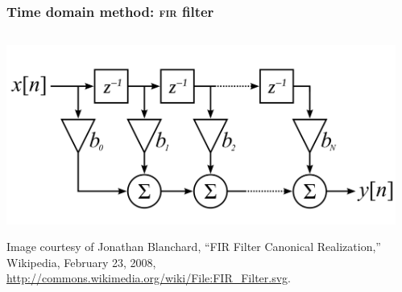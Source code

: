 \documentclass{beamer}
\begin{document}
\section[Method]{}

\begin{frame}
	\frametitle{Time domain method: \textsc{fir} filter}
	\begin{columns}
		\begin{column}{0.6\textwidth}
			\includegraphics[width=\textwidth]{figures/fir}
			\begin{flushleft}
				\scriptsize{Image courtesy of Jonathan Blanchard, ``FIR Filter Canonical Realization,'' Wikipedia, February 23, 2008, \url{http://commons.wikimedia.org/wiki/File:FIR_Filter.svg}.}
			\end{flushleft}
		\end{column}
		\begin{column}{0.4\textwidth}
		\end{column}
	\end{columns}
\end{frame}
\end{document}
